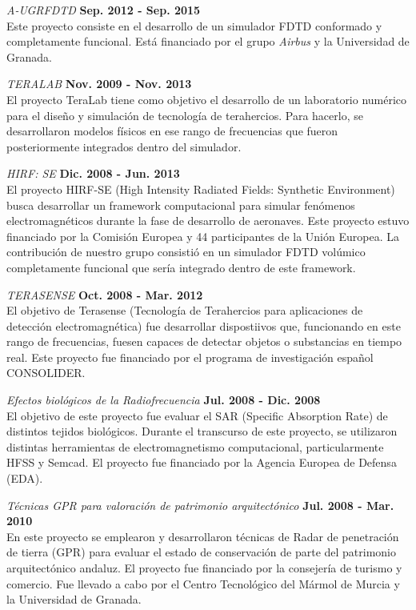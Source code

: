 \documentclass[a4paper,margin,line]{res}
\begin{document}
\begin{resume}
\begin{minipage}{\textwidth}
{\em A-UGRFDTD} \hfill {\bf Sep. 2012 - Sep. 2015}\\
Este proyecto consiste en el desarrollo de un simulador FDTD conformado y completamente funcional. 
Está financiado por el grupo {\it Airbus} y la Universidad de Granada.
\end{minipage}

{\em TERALAB} \hfill {\bf Nov. 2009 - Nov. 2013}\\
El proyecto TeraLab tiene como objetivo el desarrollo de un laboratorio numérico para el diseño y simulación de tecnología de terahercios. 
Para hacerlo, se desarrollaron modelos físicos en ese rango de frecuencias que fueron posteriormente integrados dentro del simulador.

{\em HIRF: SE} \hfill {\bf Dic. 2008 - Jun. 2013}\\
El proyecto HIRF-SE (High Intensity Radiated Fields: Synthetic Environment) busca desarrollar un framework computacional para simular fenómenos electromagnéticos durante la fase de desarrollo de aeronaves. Este proyecto estuvo financiado por la Comisión Europea y 44 participantes de la Unión Europea. La contribución de nuestro grupo consistió en un simulador FDTD volúmico completamente funcional que sería integrado dentro de este framework.

{\em TERASENSE} \hfill {\bf Oct. 2008 - Mar. 2012}\\
El objetivo de Terasense (Tecnología de Terahercios para aplicaciones de detección electromagnética) fue desarrollar dispostiivos que, funcionando en este rango de frecuencias, fuesen capaces de detectar objetos o substancias en tiempo real. Este proyecto fue financiado por el programa de investigación español CONSOLIDER.

{\em Efectos biológicos de la Radiofrecuencia} \hfill {\bf Jul. 2008 - Dic. 2008}\\
El objetivo de este proyecto fue evaluar el SAR (Specific Absorption Rate) de distintos tejidos biológicos.
Durante el transcurso de este proyecto, se utilizaron distintas herramientas de electromagnetismo computacional, particularmente HFSS y Semcad. El proyecto fue financiado por la Agencia Europea de Defensa (EDA).

\begin{minipage}{\textwidth}
{\em Técnicas GPR para valoración de patrimonio arquitectónico} \hfill {\bf Jul. 2008 - Mar. 2010}\\
En este proyecto se emplearon y desarrollaron técnicas de Radar de penetración de tierra (GPR) para evaluar el estado de conservación de parte del patrimonio arquitectónico andaluz. El proyecto fue financiado por la consejería de turismo y comercio. Fue llevado a cabo por el Centro Tecnológico del Mármol de Murcia y la Universidad de Granada.
\end{minipage}


\end{resume}
\end{document}
